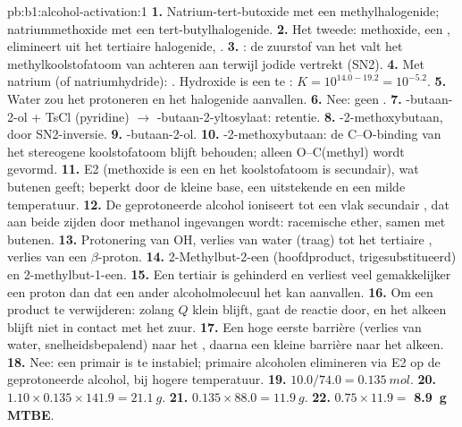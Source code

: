 \begin{solution}{pb:b1:alcohol-activation:1}
\textbf{1.} Natrium-tert-butoxide met een methylhalogenide;
natriummethoxide met een tert-butylhalogenide.
\textbf{2.} Het tweede: methoxide, een , elimineert uit het
tertiaire halogenide, .
\textbf{3.} : de zuurstof van het
 valt het methylkoolstofatoom van achteren aan terwijl jodide
vertrekt (SN2).
\textbf{4.} Met natrium (of natriumhydride): . Hydroxide is een te : $K = 10^{14.0 -
19.2} = 10^{-5.2}$.
\textbf{5.} Water zou het  protoneren en het halogenide aanvallen.
\textbf{6.} Nee: geen .
\textbf{7.} -butaan-2-ol + TsCl (pyridine) $\to$
-butaan-2-yltosylaat: retentie.
\textbf{8.} -2-methoxybutaan, door SN2-inversie.
\textbf{9.} -butaan-2-ol.
\textbf{10.} -2-methoxybutaan: de C--O-binding van het stereogene
koolstofatoom blijft behouden; alleen O--C(methyl) wordt gevormd.
\textbf{11.} E2 (methoxide is een  en het koolstofatoom is
secundair), wat butenen geeft; beperkt door de kleine base, een
uitstekende  en een milde temperatuur.
\textbf{12.} De geprotoneerde alcohol ioniseert tot een vlak secundair
, dat aan beide zijden door methanol ingevangen wordt:
racemische ether, samen met butenen.
\textbf{13.} Protonering van OH, verlies van water (traag) tot het
tertiaire , verlies van een $\beta$-proton.
\textbf{14.} 2-Methylbut-2-een (hoofdproduct, trigesubstitueerd) en
2-methylbut-1-een.
\textbf{15.} Een tertiair  is gehinderd en verliest veel
gemakkelijker een proton dan dat een ander alcoholmolecuul het kan
aanvallen.
\textbf{16.} Om een product te verwijderen: zolang $Q$ klein blijft, gaat
de reactie door, en het alkeen blijft niet in contact met het zuur.
\textbf{17.} Een hoge eerste barrière (verlies van water,
snelheidsbepalend) naar het , daarna een kleine barrière naar
het alkeen.
\textbf{18.} Nee: een primair  is te instabiel; primaire
alcoholen elimineren via E2 op de geprotoneerde alcohol, bij hogere
temperatuur.
\textbf{19.} $10.0/74.0 = \qty{0.135}{mol}$.
\textbf{20.} $1.10 \times 0.135 \times 141.9 = \qty{21.1}{g}$.
\textbf{21.} $0.135 \times 88.0 = \qty{11.9}{g}$.
\textbf{22.} $0.75 \times 11.9 =$ \textbf{\qty{8.9}{g} MTBE}.
\end{solution}
